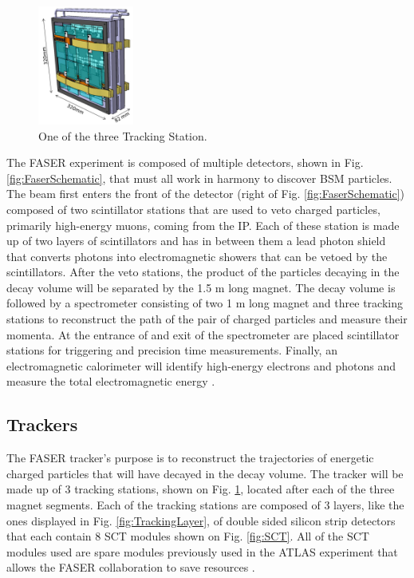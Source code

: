\begin{figure}
  \centering
    \includegraphics[width=0.28\textwidth]{ChapterFaser/Figs/Raster/TrackerStation.jpg} 
    \caption[Tracking Station]{One of the three Tracking Station.}
    \label{fig:TrackingStation}
\end{figure}

The FASER experiment is composed of multiple detectors, shown in Fig. \ref{fig:FaserSchematic}, that must all work in harmony to discover BSM particles. The beam first enters the front of the detector (right of Fig. \ref{fig:FaserSchematic}) composed of two scintillator stations that are used to veto charged particles, primarily high-energy muons, coming from the IP. Each of these station is made up of two layers of scintillators and has in between them a lead photon shield that converts photons into electromagnetic showers that can be vetoed by the scintillators. After the veto stations, the product of the particles decaying in the decay volume will be separated by the 1.5 m long magnet. The decay volume is followed by a spectrometer consisting of two 1 m long magnet and three tracking stations to reconstruct the path of the pair of charged particles and measure their momenta. At the entrance of and exit of the spectrometer are placed scintillator stations for triggering and precision time measurements. Finally, an electromagnetic calorimeter will identify high-energy electrons and photons and measure the total electromagnetic energy \cite{faser_collaboration_technical_2018}.

\subsection{Trackers}
The FASER tracker's purpose is to reconstruct the trajectories of energetic charged particles that will have decayed in the decay volume. The tracker will be made up of 3 tracking stations, shown on Fig. \ref{fig:TrackingStation}, located after each of the three magnet segments. Each of the tracking stations are composed of 3 layers, like the ones displayed in Fig. \ref{fig:TrackingLayer}, of double sided silicon strip detectors that each contain 8 SCT modules shown on Fig. \ref{fig:SCT}. All of the SCT modules used are spare modules previously used in the ATLAS experiment that allows the FASER collaboration to save 
resources \cite{faser_collaboration_technical_2018}.

